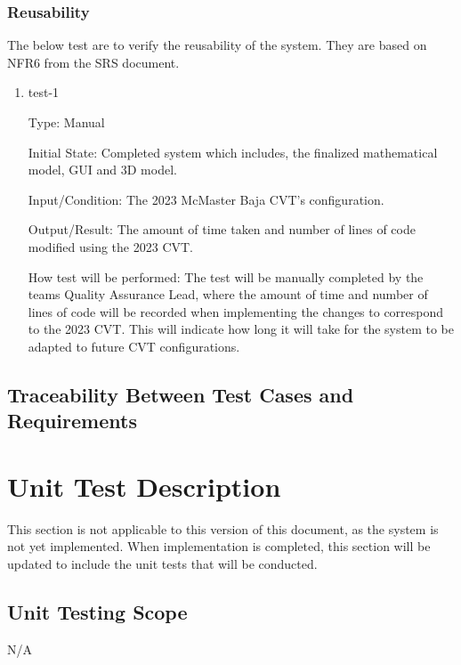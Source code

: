 \documentclass[12pt, titlepage]{article}
\begin{document}
\subsubsection{Reusability}

The below test are to verify the reusability of the system.
They are based on NFR6 from the SRS document.

\begin{enumerate}

\item{test-1\\}
    
Type: Manual
              
Initial State: Completed system which includes, the finalized mathematical model, GUI and 3D model.  
              
Input/Condition: The 2023 McMaster Baja CVT's configuration. 
              
Output/Result: The amount of time taken and number of lines of code modified using the 2023 CVT.
              
How test will be performed: The test will be manually completed by the teams Quality Assurance Lead, where the amount of time and number of lines of code will be recorded when implementing the changes to correspond to the 2023 CVT.
This will indicate how long it will take for the system to be adapted to future CVT configurations. 
    
\end{enumerate}

\subsection{Traceability Between Test Cases and Requirements}


\section{Unit Test Description}

This section is not applicable to this version of this document, as the system is not yet implemented.
When implementation is completed, this section will be updated to include the unit tests that will be conducted.

\subsection{Unit Testing Scope}
N/A
\end{document}
